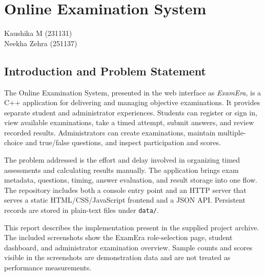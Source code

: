 \documentclass[12pt,a4paper,oneside]{book}
\makeatletter
\newcommand{\chapterauthor}[1]{%
  {\parindent0pt\vspace*{-15pt}%
  \linespread{1.1}\large\itshape\begin{flushright}#1\end{flushright}%
  \par\nobreak\vspace*{25pt}}
  \@afterheading%
}
\makeatother
\begin{document}
\mainmatter

\chapter{Online Examination System}
\chapterauthor{Kaushika M (231131)\\Neekha Zehra (251137)}

\section{Introduction and Problem Statement}
The Online Examination System, presented in the web interface as \emph{ExamEra}, is a C++ application for delivering and managing objective examinations. It provides separate student and administrator experiences. Students can register or sign in, view available examinations, take a timed attempt, submit answers, and review recorded results. Administrators can create examinations, maintain multiple-choice and true/false questions, and inspect participation and scores.

The problem addressed is the effort and delay involved in organizing timed assessments and calculating results manually. The application brings exam metadata, questions, timing, answer evaluation, and result storage into one flow. The repository includes both a console entry point and an HTTP server that serves a static HTML/CSS/JavaScript frontend and a JSON API. Persistent records are stored in plain-text files under \texttt{data/}.

This report describes the implementation present in the supplied project archive. The included screenshots show the ExamEra role-selection page, student dashboard, and administrator examination overview. Sample counts and scores visible in the screenshots are demonstration data and are not treated as performance measurements.
\end{document}
